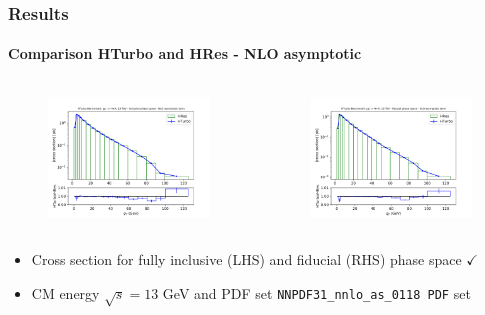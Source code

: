 \documentclass[aspectratio=43]{beamer}
\begin{document}
\begin{frame}
	
	\frametitle{Results}
	\framesubtitle{Comparison HTurbo and HRes - NLO asymptotic}

	\footnotesize
	
	\begin{columns}
		
		
		\begin{figure}
			\includegraphics[width = 7cm]{plots/part3/chapter6/nnlo-ct-1.png}
		\end{figure}
		
		
		\begin{figure}
			\includegraphics[width = 7cm]{plots/part3/chapter6/nnlo-ct-fid-1.png}
		\end{figure}
		
	\end{columns}
	
	\begin{itemize}
		\item Cross section for fully inclusive (LHS) and fiducial (RHS) phase space {\color{darkgreen}$\checkmark$} 
		\item CM energy $\sqrt s = 13$ GeV and PDF set \texttt{NNPDF31\_nnlo\_as\_0118 PDF} set
	\end{itemize}

\end{frame}
\end{document}
